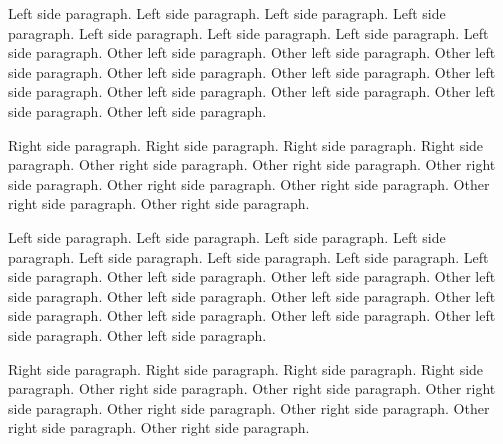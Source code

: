 \documentclass{article}
\begin{document}
\begin{pairs}
    \begin{Leftside}
        \beginnumbering
            \pstart
                Left side paragraph. Left side paragraph. Left side paragraph. Left side paragraph. Left side paragraph. Left side paragraph. Left side paragraph. Left side paragraph.
            \pend
            \pstart
                Other left side paragraph.  Other left side paragraph.  Other left side paragraph.  Other left side paragraph.  Other left side paragraph.  Other left side paragraph.  Other left side paragraph.  Other left side paragraph.  Other left side paragraph.  Other left side paragraph.
            \pend
        \endnumbering
    \end{Leftside}
    \begin{Rightside}
        \beginnumbering
            \pstart
                Right side paragraph. Right side paragraph. Right side paragraph. Right side paragraph.
            \pend
            \pstart
                Other right side paragraph. Other right side paragraph. Other right side paragraph. Other right side paragraph. Other right side paragraph. Other right side paragraph. Other right side paragraph.
            \pend
        \endnumbering
    \end{Rightside}

\end{pairs}
\Columns

\begin{pages}
    \begin{Leftside}
        \beginnumbering
            \pstart
                Left side paragraph. Left side paragraph. Left side paragraph. Left side paragraph. Left side paragraph. Left side paragraph. Left side paragraph. Left side paragraph.
            \pend
            \pstart
                Other left side paragraph.  Other left side paragraph.  Other left side paragraph.  Other left side paragraph.  Other left side paragraph.  Other left side paragraph.  Other left side paragraph.  Other left side paragraph.  Other left side paragraph.  Other left side paragraph.
            \pend
        \endnumbering
    \end{Leftside}
    \begin{Rightside}
        \beginnumbering
            \pstart
                Right side paragraph. Right side paragraph. Right side paragraph. Right side paragraph.
            \pend
            \pstart
                Other right side paragraph. Other right side paragraph. Other right side paragraph. Other right side paragraph. Other right side paragraph. Other right side paragraph. Other right side paragraph.
            \pend
        \endnumbering
    \end{Rightside}

\end{pages}
\Pages
\end{document}
